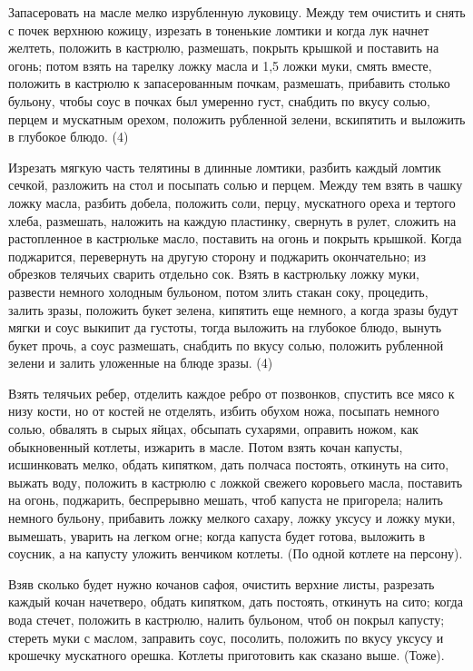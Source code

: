 Запасеровать на масле мелко изрубленную луковицу. Между тем очистить и снять с почек верхнюю кожицу, изрезать в тоненькие ломтики и когда лук начнет желтеть, положить в кастрюлю, размешать, покрыть крышкой и поставить на огонь; потом взять на тарелку ложку масла и 1,5 ложки муки, смять вместе, положить в кастрюлю к запасерованным почкам, размешать, прибавить столько бульону, чтобы соус в почках был умеренно густ, снабдить по вкусу солью, перцем и мускатным орехом, положить рубленной зелени, вскипятить и выложить в глубокое блюдо. (4) 


Изрезать мягкую часть телятины в длинные ломтики, разбить каждый ломтик сечкой, разложить на стол и посыпать солью и перцем. Между тем взять в чашку ложку масла, разбить добела, положить соли, перцу, мускатного ореха и тертого хлеба, размешать, наложить на каждую пластинку, свернуть в рулет, сложить на растопленное в кастрюльке масло, поставить на огонь и покрыть крышкой. Когда поджарится, перевернуть на другую сторону и поджарить окончательно; из обрезков телячьих сварить отдельно сок. Взять в кастрюльку ложку муки, развести немного холодным бульоном, потом злить стакан соку, процедить, залить зразы, положить букет зелена, кипятить еще немного, а когда зразы будут мягки и соус выкипит да густоты, тогда выложить на глубокое блюдо, вынуть букет прочь, а соус размешать, снабдить по вкусу солью, положить рубленной зелени и залить уложенные на блюде зразы. (4) 


Взять телячьих ребер, отделить каждое ребро от позвонков, спустить все мясо к низу кости, но от костей не отделять, избить обухом ножа, посыпать немного солью, обвалять в сырых яйцах, обсыпать сухарями, оправить ножом, как обыкновенный котлеты, изжарить в масле. Потом взять кочан капусты, исшинковать мелко, обдать кипятком, дать полчаса постоять, откинуть на сито, выжать воду, положить в кастрюлю с ложкой свежего коровьего масла, поставить на огонь, поджарить, беспрерывно мешать, чтоб капуста не пригорела; налить немного бульону, прибавить ложку мелкого сахару, ложку уксусу и ложку муки, вымешать, уварить на легком огне; когда капуста будет готова, выложить в соусник, а на капусту уложить венчиком котлеты. (По одной котлете на персону). 


Взяв сколько будет нужно кочанов сафоя, очистить верхние листы, разрезать каждый кочан начетверо, обдать кипятком, дать постоять, откинуть на сито; когда вода стечет, положить в кастрюлю, налить бульоном, чтоб он покрыл капусту; стереть муки с маслом, заправить соус, посолить, положить по вкусу уксусу и крошечку мускатного орешка. Котлеты приготовить как сказано выше. (Тоже). 

